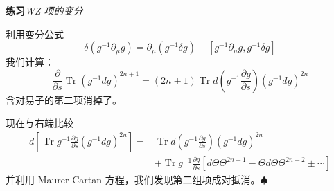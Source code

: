 \medskip\noindent\textbf{练习}\quad\emph{WZ 项的变分}

利用变分公式
\begin{equation}
  \delta(g^{-1}\partial_\mu g)=\partial_\mu(g^{-1}\delta g)+[g^{-1}\partial_\mu g,g^{-1}\delta g]
  \tag{4.29}
  \label{eq:4.29}
\end{equation}
我们计算：
\begin{equation}
  \frac{\partial}{\partial s}\operatorname{Tr}(g^{-1}dg)^{2n+1}
  =(2n+1)\operatorname{Tr}d\left(g^{-1}\frac{\partial g}{\partial s}\right)(g^{-1}dg)^{2n}
  \tag{4.30}
  \label{eq:4.30}
\end{equation}
含对易子的第二项消掉了。

现在与右端比较
\begin{equation}
  \begin{aligned}
    d\left[\operatorname{Tr}g^{-1}\frac{\partial g}{\partial s}(g^{-1}dg)^{2n}\right]
    ={}&\operatorname{Tr}d\left(g^{-1}\frac{\partial g}{\partial s}\right)(g^{-1}dg)^{2n}\\
    &+\operatorname{Tr}g^{-1}\frac{\partial g}{\partial s}\left[d\Theta\Theta^{2n-1}-\Theta d\Theta\Theta^{2n-2}\pm\cdots\right]
  \end{aligned}
  \tag{4.31}
  \label{eq:4.31}
\end{equation}
并利用 Maurer-Cartan 方程，我们发现第二组项成对抵消。$\spadesuit$
